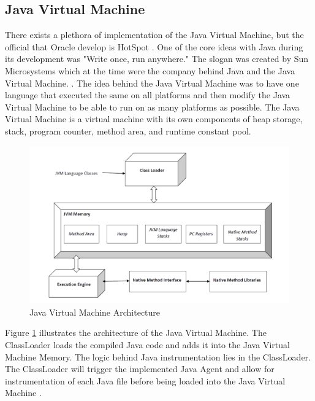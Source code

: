 \subsection{Java Virtual Machine}
There exists a plethora of implementation of the Java Virtual Machine, but the official that Oracle develop is HotSpot \parencite{hotSpot}. One of the core ideas with Java during its development was "Write once, run anywhere." The slogan was created by Sun Microsystems which at the time were the company behind Java and the Java Virtual Machine. \parencite{Craig_2006}. The idea behind the Java Virtual Machine was to have one language that executed the same on all platforms and then modify the Java Virtual Machine to be able to run on as many platforms as possible. The Java Virtual Machine is a virtual machine with its own components of heap storage, stack, program counter, method area, and runtime constant pool.

\begin{figure}
    \centering
    \includegraphics[width=\textwidth]{images/JvmSpec7.png}
    \caption{Java Virtual Machine Architecture}
    \label{fig:JVM}
\end{figure}

Figure \ref{fig:JVM} illustrates the architecture of the Java Virtual Machine. The ClassLoader loads the compiled Java code and adds it into the Java Virtual Machine Memory. The logic behind Java instrumentation lies in the ClassLoader. The ClassLoader will trigger the implemented Java Agent and allow for instrumentation of each Java file before being loaded into the Java Virtual Machine \parencite{venners_1999, instru}.




